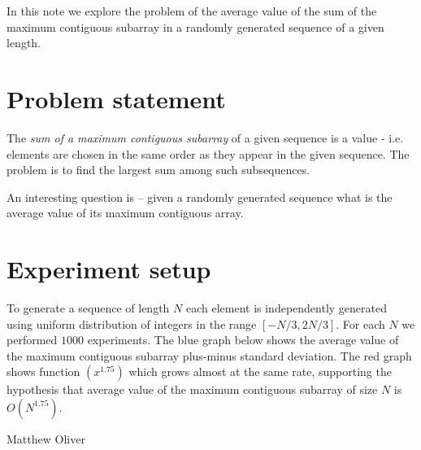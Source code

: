 \documentclass{article}
\begin{document}
In this note we explore the problem of the average value 
of the sum of the maximum contiguous subarray in 
a randomly generated sequence of a given length.

\section{Problem statement}
The {\it sum of a maximum contiguous subarray} of a given sequence 
is a value - i.e. elements are chosen in the same order 
as they appear in the given sequence. The problem 
is to find the largest sum among such subsequences.

An interesting question is -- given a randomly generated sequence
what is the average value of its maximum contiguous array.

\section{Experiment setup}
To generate a sequence of length $N$ each element is independently generated
using uniform distribution of integers in the range $[-N/3, 2N/3]$. For each
$N$ we performed $1000$ experiments. The blue graph below shows the average
value of the maximum contiguous subarray plus-minus standard deviation. The
red graph shows function $(x^1.75)$ which grows almost at the same rate, supporting 
the hypothesis that average value of the maximum contiguous subarray of size $N$
is $O(N^1.75)$.



Matthew Oliver
\end{document}
